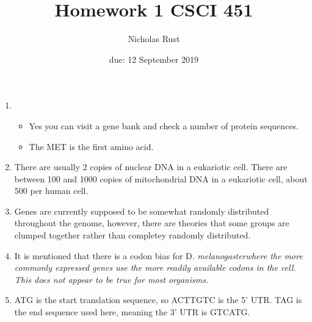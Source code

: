 \documentclass{article}
\title{Homework 1 CSCI 451}
\author{Nicholas Rust}
\date{due: 12 September 2019}
\begin{document}
\maketitle

\begin{enumerate}
	\item
	\begin{itemize}
		\item Yes you can visit a gene bank and check a number of protein sequences.
		\item The MET is the first amino acid.
	\end{itemize}
	\item There are usually 2 copies of nuclear DNA in a eukariotic cell. There are between 100 and 1000 copies of mitochondrial DNA in a eukariotic cell, about 500 per human cell.
	\item Genes are currently supposed to be somewhat randomly distributed throughout the genome, however, there are theories that some groups are clumped together rather than completey randomly distributed.
	\item It is mentioned that there is a codon bias for D. \em{melanogaster}\em where the more commonly expressed genes use the more readily available codons in the cell. This does not appear to be true for most organisms.
	\item ATG is the start translation sequence, so ACTTGTC is the 5' UTR. TAG is the end sequence used here, meaning the 3' UTR is GTCATG. 
\end{enumerate}
\end{document}
